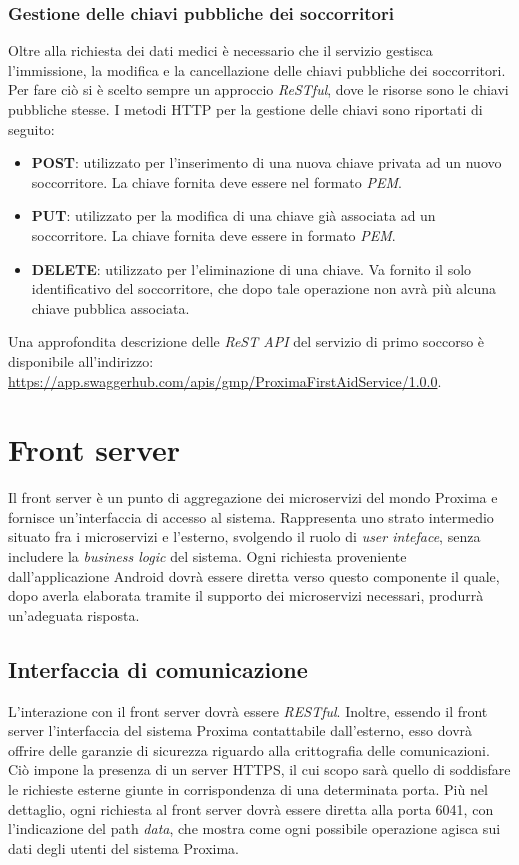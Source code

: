 \documentclass[a4paper,12pt]{report}
\begin{document}
\subsubsection*{Gestione delle chiavi pubbliche dei soccorritori}
Oltre alla richiesta dei dati medici è necessario che il servizio gestisca l'immissione, la modifica e la cancellazione delle chiavi pubbliche dei soccorritori. Per fare ciò si è scelto sempre un approccio \emph{ReSTful}, dove le risorse sono le chiavi pubbliche stesse. I metodi HTTP per la gestione delle chiavi sono riportati di seguito: 
\begin{itemize}
	\item \textbf{POST}: utilizzato per l'inserimento di una nuova chiave privata ad un nuovo soccorritore. La chiave fornita deve essere nel formato \emph{PEM}.
	\item \textbf{PUT}: utilizzato per la modifica di una chiave già associata ad un soccorritore. La chiave fornita deve essere in formato \emph{PEM}.
	\item \textbf{DELETE}: utilizzato per l'eliminazione di una chiave. Va fornito il solo identificativo del soccorritore, che dopo tale operazione non avrà più alcuna chiave pubblica associata. 
\end{itemize}
Una approfondita descrizione delle \emph{ReST API} del servizio di primo soccorso è disponibile all'indirizzo: \\ 
\url{https://app.swaggerhub.com/apis/gmp/ProximaFirstAidService/1.0.0}.

\section{Front server}
Il front server è un punto di aggregazione dei microservizi del mondo Proxima e fornisce un'interfaccia di accesso al sistema. Rappresenta uno strato intermedio situato fra i microservizi e l'esterno, svolgendo il ruolo di \emph{user inteface}, senza includere la \emph{business logic} del sistema. Ogni richiesta proveniente dall'applicazione Android dovrà essere diretta verso questo componente il quale, dopo averla elaborata tramite il supporto dei microservizi necessari, produrrà un'adeguata risposta.

\subsection{Interfaccia di comunicazione} \label{frontserver-api}
L'interazione con il front server dovrà essere \emph{RESTful}. Inoltre, essendo il front server l'interfaccia del sistema Proxima contattabile dall'esterno, esso dovrà offrire delle garanzie di sicurezza riguardo alla crittografia delle comunicazioni. Ciò impone la presenza di un server HTTPS, il cui scopo sarà quello di soddisfare le richieste esterne giunte in corrispondenza di una determinata porta. Più nel dettaglio, ogni richiesta al front server dovrà essere diretta alla porta 6041, con l'indicazione del path \emph{data}, che mostra come ogni possibile operazione agisca sui dati degli utenti del sistema Proxima. 
\end{document}
